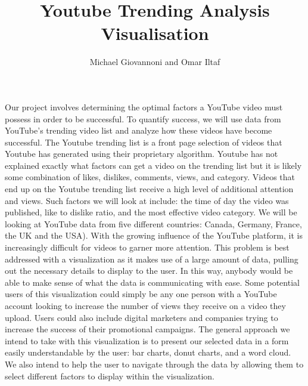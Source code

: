 \documentclass[journal]{vgtc}                %
\title{Youtube Trending Analysis Visualisation}
\author{Michael Giovannoni and Omar Iltaf}
\begin{document}


\maketitle

Our project involves determining the optimal factors a YouTube video must possess in order to be successful. To quantify success, we will use data from YouTube's trending video list and analyze how these videos have become successful. The Youtube trending list is a front page selection of videos that Youtube has generated using their proprietary algorithm. Youtube has not explained exactly what factors can get a video on the trending list but it is likely some combination of likes, dislikes, comments, views, and category. Videos that end up on the Youtube trending list receive a high level of additional attention and views. Such factors we will look at include: the time of day the video was published, like to dislike ratio, and the most effective video category. We will be looking at YouTube data from five different countries: Canada, Germany, France, the UK and the USA). With the growing influence of the YouTube platform, it is increasingly difficult for videos to garner more attention. This problem is best addressed with a visualization as it makes use of a large amount of data, pulling out the necessary details to display to the user. In this way, anybody would be able to make sense of what the data is communicating with ease. Some potential users of this visualization could simply be any one person with a YouTube account looking to increase the number of views they receive on a video they upload. Users could also include digital marketers and companies trying to increase the success of their promotional campaigns. The general approach we intend to take with this visualization is to present our selected data in a form easily understandable by the user: bar charts, donut charts, and a word cloud. We also intend to help the user to navigate through the data by allowing them to select different factors to display within the visualization.
\end{document}
